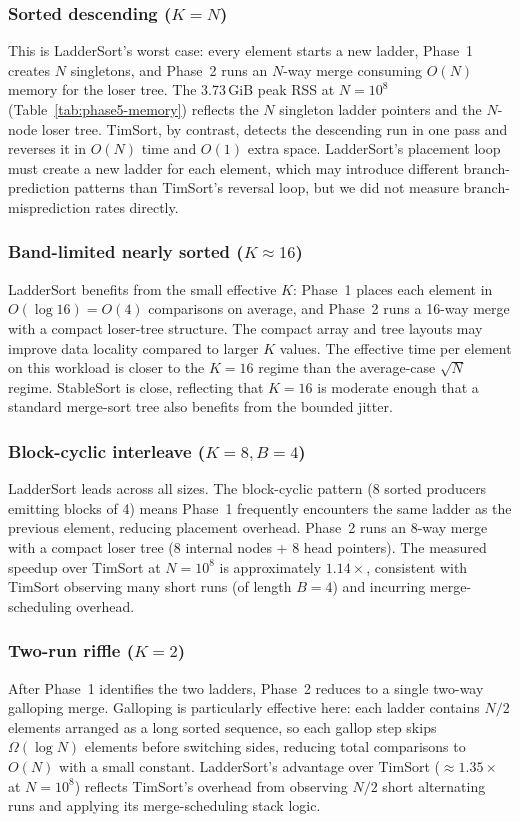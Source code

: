 \documentclass[12pt,a4paper]{article}
\theoremstyle{plain}
\theoremstyle{definition}
\begin{document}
\subsubsection{Sorted descending ($K=N$)}
This is LadderSort's worst case: every element starts a new ladder,
Phase~1 creates $N$ singletons, and Phase~2 runs an $N$-way merge consuming
$O(N)$ memory for the loser tree.  The 3.73\,GiB peak RSS at $N=10^8$
(Table~\ref{tab:phase5-memory}) reflects the $N$ singleton ladder pointers
and the $N$-node loser tree.  TimSort, by contrast, detects the descending
run in one pass and reverses it in $O(N)$ time and $O(1)$ extra space.
LadderSort's placement loop must create a new ladder for each element,
which may introduce different branch-prediction patterns than TimSort's
reversal loop, but we did not measure branch-misprediction rates directly.

\subsubsection{Band-limited nearly sorted ($K \approx 16$)}
LadderSort benefits from the small effective $K$: Phase~1 places each element
in $O(\log 16) = O(4)$ comparisons on average, and Phase~2 runs a 16-way
merge with a compact loser-tree structure.  The compact array and tree layouts
may improve data locality compared to larger $K$ values.  The effective time per element on
this workload is closer to the $K = 16$ regime than the average-case $\sqrt{N}$ regime.  StableSort is close,
reflecting that $K=16$ is moderate enough that a standard merge-sort tree also
benefits from the bounded jitter.

\subsubsection{Block-cyclic interleave ($K=8, B=4$)}
LadderSort leads across all sizes.  The block-cyclic pattern (8 sorted
producers emitting blocks of 4) means Phase~1 frequently encounters the same
ladder as the previous element, reducing placement overhead.  Phase~2 runs an
8-way merge with a compact loser tree (8 internal nodes + 8 head pointers).
The measured speedup over TimSort at $N=10^8$ is approximately $1.14\times$,
consistent with TimSort observing many short runs (of length $B=4$) and
incurring merge-scheduling overhead.

\subsubsection{Two-run riffle ($K=2$)}
After Phase~1 identifies the two ladders, Phase~2 reduces to a single
two-way galloping merge.  Galloping is particularly effective here: each
ladder contains $N/2$ elements arranged as a long sorted sequence, so
each gallop step skips $\Omega(\log N)$ elements before switching sides,
reducing total comparisons to $O(N)$ with a small constant.  LadderSort's
advantage over TimSort ($\approx 1.35\times$ at $N=10^8$) reflects TimSort's
overhead from observing $N/2$ short alternating runs and applying its
merge-scheduling stack logic.
\end{document}
